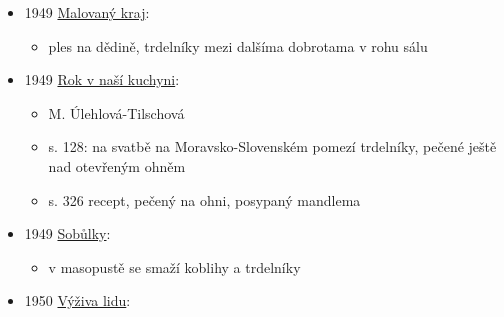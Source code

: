 \begin{itemize}
  \begin{itemize}
  \tightlist
  \item
    není online, 
  \item
    s. 45: žeš tú cestú mnoho spravit!{\kern0pt}`` rozprávěla moudře
    Putnická. A ochutnávajíc podaný trdelník, znalecky jej pochválila:
    „Všecka čest! Takové trdelníky možú na nejlepší stůl. To budú
    křtiny! Tož si o téj hostině
  \end{itemize}
\item
  1949
  \href{https://ceskadigitalniknihovna.cz/uuid/uuid:66097490-f209-11e3-a012-005056825209}{Malovaný
  kraj}:

  \begin{itemize}
  \tightlist
  \item
    ples na dědině, trdelníky mezi dalšíma dobrotama v rohu sálu
  \end{itemize}
\item
  1949
  \href{https://ceskadigitalniknihovna.cz/uuid/uuid:3c65e0dc-eea0-4315-9819-a34d4fe39616}{Rok
  v naší kuchyni}:

  \begin{itemize}
  \tightlist
  \item
    M. Úlehlová-Tilschová
  \item
    s. 128: na svatbě na Moravsko-Slovenském pomezí trdelníky, pečené
    ještě nad otevřeným ohněm
  \item
    s. 326 recept, pečený na ohni, posypaný mandlema
  \end{itemize}
\item
  1949
  \href{https://www.digitalniknihovna.cz/mzk/uuid/uuid:16c2c002-5cba-4d15-9eef-9988934dc051}{Sobůlky}:

  \begin{itemize}
  \tightlist
  \item
    v masopustě se smaží koblihy a trdelníky
  \end{itemize}
\item
  1950
  \href{https://ceskadigitalniknihovna.cz/uuid/uuid:2b1880f0-c9af-11ee-a038-005056827e52}{Výživa
  lidu}:


\end{itemize}
